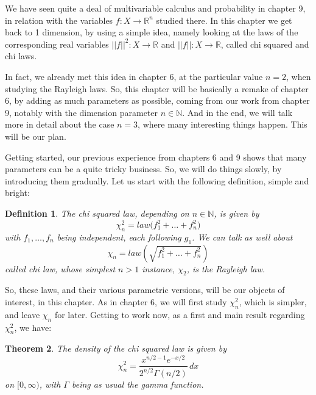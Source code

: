 \documentclass[12pt]{amsbook}
\newtheorem{theorem}{Theorem}[chapter]
\newtheorem{definition}[theorem]{Definition}
\begin{document}
We have seen quite a deal of multivariable calculus and probability in chapter 9, in relation with the variables $f:X\to\mathbb R^n$ studied there. In this chapter we get back to 1 dimension, by using a simple idea, namely looking at the laws of the corresponding real variables $||f||^2:X\to\mathbb R$ and $||f||:X\to\mathbb R$, called chi squared and chi laws.

\bigskip

In fact, we already met this idea in chapter 6, at the particular value $n=2$, when studying the Rayleigh laws. So, this chapter will be basically a remake of chapter 6, by adding as much parameters as possible, coming from our work from chapter 9, notably with the dimension parameter $n\in\mathbb N$. And in the end, we will talk more in detail about the case $n=3$, where many interesting things happen. This will be our plan.

\bigskip

Getting started, our previous experience from chapters 6 and 9 shows that many parameters can be a quite tricky business. So, we will do things slowly, by introducing them gradually. Let us start with the following definition, simple and bright:


\begin{definition}
The chi squared law, depending on $n\in\mathbb N$, is given by
$$\chi_n^2=law\Big(f_1^2+\ldots+f_n^2\Big)$$
with $f_1,\ldots,f_n$ being independent, each following $g_1$. We can talk as well about
$$\chi_n=law\left(\sqrt{f_1^2+\ldots+f_n^2}\right)$$
called chi law, whose simplest $n>1$ instance, $\chi_2$, is the Rayleigh law.
\end{definition}

So, these laws, and their various parametric versions, will be our objects of interest, in this chapter. As in chapter 6, we will first study $\chi_n^2$, which is simpler, and leave $\chi_n$ for later. Getting to work now, as a first and main result regarding $\chi_n^2$, we have:


\begin{theorem}
The density of the chi squared law is given by
$$\chi_n^2=\frac{x^{n/2-1}e^{-x/2}}{2^{n/2}\Gamma(n/2)}\,dx$$
on $[0,\infty)$, with $\Gamma$ being as usual the gamma function.
\end{theorem}
\end{document}
